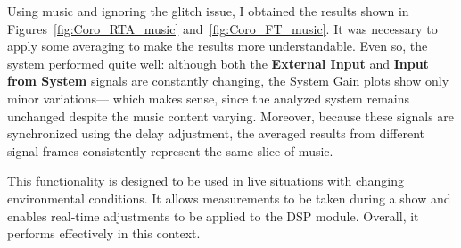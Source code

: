 Using music and ignoring the glitch issue, I obtained the results shown in Figures~\ref{fig:Coro_RTA_music} and~\ref{fig:Coro_FT_music}. It was necessary to apply some averaging to make the results more understandable. Even so, the system performed quite well: although both the \textbf{External Input} and \textbf{Input from System} signals are constantly changing, the System Gain plots show only minor variations— which makes sense, since the analyzed system remains unchanged despite the music content varying. Moreover, because these signals are synchronized using the delay adjustment, the averaged results from different signal frames consistently represent the same slice of music.

This functionality is designed to be used in live situations with changing environmental conditions. It allows measurements to be taken during a show and enables real-time adjustments to be applied to the DSP module. Overall, it performs effectively in this context.

